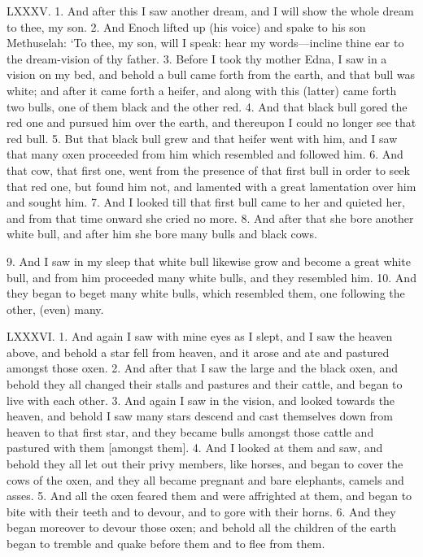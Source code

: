 LXXXV. 1. And after this I saw another dream,
and I will show the whole dream to thee, my son.
2. And Enoch lifted up (his voice) and spake to his
son Methuselah: ‘To thee, my son, will I speak:
hear my words—incline thine ear to the dream-vision
of thy father. 3. Before I took thy mother Edna, I
saw in a vision on my bed, and behold a bull came
forth from the earth, and that bull was white; and
after it came forth a heifer, and along with this
(latter) came forth two bulls, one of them black and
the other red. 4. And that black bull gored the red
one and pursued him over the earth, and thereupon I
could no longer see that red bull. 5. But that black
bull grew and that heifer went with him, and I saw
that many oxen proceeded from him which resembled
and followed him. 6. And that cow, that first one, went
from the presence of that first bull in order to seek
that red one, but found him not, and lamented with
a great lamentation over him and sought him. 7. And
I looked till that first bull came to her and quieted
her, and from that time onward she cried no more.
8. And after that she bore another white bull, and
after him she bore many bulls and black cows.

9. And I saw in my sleep that white bull likewise
grow and become a great white bull, and from him
proceeded many white bulls, and they resembled him.
10. And they began to beget many white bulls, which
resembled them, one following the other, (even)
many.


LXXXVI. 1. And again I saw with mine eyes as I
slept, and I saw the heaven above, and behold a star
fell from heaven, and it arose and ate and pastured
amongst those oxen. 2. And after that I saw the
large and the black oxen, and behold they all changed
their stalls and pastures and their cattle, and began
to live with each other. 3. And again I saw in the
vision, and looked towards the heaven, and behold I
saw many stars descend and cast themselves down
from heaven to that first star, and they became bulls
amongst those cattle and pastured with them [amongst
them]. 4. And I looked at them and saw, and behold
they all let out their privy members, like horses,
and began to cover the cows of the oxen, and they
all became pregnant and bare elephants, camels and
asses. 5. And all the oxen feared them and were
affrighted at them, and began to bite with their teeth
and to devour, and to gore with their horns. 6. And
they began moreover to devour those oxen; and
behold all the children of the earth began to tremble
and quake before them and to flee from them.

